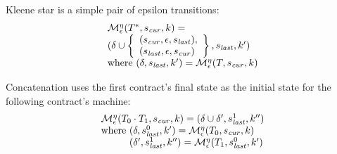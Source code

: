 Kleene star is a simple pair of epsilon transitions:
\begin{align*}
  \begin{array}{l}
  {\mathcal M}_\epsilon^\eta(T^*, s_\mathit{cur}, k) = \\
  (\delta \cup \left\{
    \begin{array}{l}
      (s_\mathit{cur}, \epsilon, s_\mathit{last}), \\
      (s_\mathit{last}, \epsilon, s_\mathit{cur})
    \end{array}\right\},
  s_\mathit{last}, k')
 \\ \text{where } (\delta, s_\mathit{last}, k') = {\mathcal M}_\epsilon^\eta(T, s_\mathit{cur}, k)
\end{array}
\end{align*}

Concatenation uses the first contract's final state as the initial state for the following contract's machine:
\begin{align*}
  \begin{array}{l}
    \epshelp^\mtimeline(\stseq{\mtcon_0}{\mtcon_1}, \pmsmqcur, k) = 
     (\delta \cup \delta', \pmsmqlast^1, k'')
   \\ \text{where } (\delta, \pmsmqlast^0, k') = \epshelp^\mtimeline(\mtcon_0, \pmsmqcur, k)
   \\\phantom{\text{where }} (\delta', \pmsmqlast^1, k'') = \epshelp^\mtimeline(\mtcon_1, \pmsmqlast^0, k')
  \end{array}
\end{align*}
%

